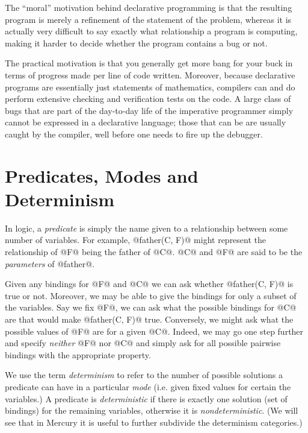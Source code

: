 The ``moral'' motivation behind declarative programming is that the
resulting program is merely a refinement of the statement of the
problem, whereas it is actually very difficult to say exactly what
relationship a program is computing, making it harder to decide whether
the program contains a bug or not.

The practical motivation is that you generally get more bang for your
buck in terms of progress made per line of code written.  Moreover,
because declarative programs are essentially just statements of
mathematics, compilers can and do perform extensive checking and
verification tests on the code.  A large class of bugs that are part of
the day-to-day life of the imperative programmer simply cannot be
expressed in a declarative language; those that can be are usually
caught by the compiler, well before one needs to fire up the debugger.




\section{Predicates, Modes and Determinism}

In logic, a \emph{predicate} is simply the name given to a relationship
between some number of variables.  For example, @father(C, F)@ might
represent the relationship of @F@ being the father of @C@.  @C@ and @F@
are said to be the \emph{parameters} of @father@.

Given any bindings for @F@ and @C@ we can ask whether @father(C, F)@ is
true or not.  Moreover, we may be able to give the bindings for only a
subset of the variables.  Say we fix @F@, we can ask what the possible
bindings for @C@ are that would make @father(C, F)@ true.  Conversely,
we might ask what the possible values of @F@ are for a given @C@.
Indeed, we may go one step further and specify \emph{neither} @F@ nor
@C@ and simply ask for all possible pairwise bindings with the
appropriate property.

We use the term \emph{determinism} to refer to the number of possible
solutions a predicate can have in a particular \emph{mode} (i.e. given
fixed values for certain the variables.)  A predicate is
\emph{deterministic} if there is exactly one solution (set of bindings)
for the remaining variables, otherwise it is \emph{nondeterministic}.
(We will see that in Mercury it is useful to further subdivide the
determinism categories.)

